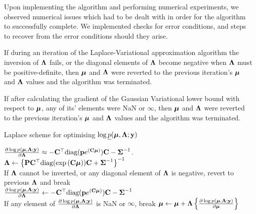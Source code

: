 	Upon implementing the algorithm and performing numerical experiments, we observed numerical issues which had to be dealt with in 
	order for the algorithm to successfully complete.
	We implemented checks for error conditions, and steps to recover from the error conditions should
	they arise.

	If during an iteration of the Laplace-Variational approximation algorithm the inversion  of ${\boldsymbol \Lambda}$
	fails, or the diagonal elements of ${\boldsymbol \Lambda}$ become negative when ${\boldsymbol \Lambda}$ must be positive-definite,
	then ${\boldsymbol \mu}$ and ${\boldsymbol \Lambda}$ were reverted to the previous iteration's ${\boldsymbol \mu}$ and ${\boldsymbol \Lambda}$ values and
	the algorithm was terminated.

	If after calculating the gradient of the Gaussian Variational lower bound with respect to ${\boldsymbol \mu}$, any of
	its' elements were NaN or $\infty$, then ${\boldsymbol \mu}$ and ${\boldsymbol \Lambda}$ were reverted to the previous iteration's
	${\boldsymbol \mu}$ and ${\boldsymbol \Lambda}$ values and the algorithm was terminated.
			
	\begin{algorithm}
		\caption{Laplace scheme for optimising $\log \underline{p}({\boldsymbol \mu}, {\boldsymbol \Lambda}; {\bf y})$}
		\label{alg:laplace_alg}
		\begin{algorithmic}
			\REQUIRE $\frac{\partial \log p({\boldsymbol \mu}, {\boldsymbol \Lambda}; {\bf y})}{\partial {\boldsymbol\Lambda}} \approx - {\bf C}^\top \text{diag}({\bf p} e^{({\bf C} {\boldsymbol \mu})}) {\bf C} - {\boldsymbol \Sigma}^{-1}$.
			\STATE ${\boldsymbol \Lambda} \leftarrow \left \{{\bf P} {\bf C}^\top \text{diag}(\exp{({\bf C}{\boldsymbol\mu})}) {\bf C} + {\boldsymbol \Sigma}^{-1} \right \}^{-1}$ \\ [1ex] 
			If ${\boldsymbol \Lambda}$ cannot be inverted, or any diagonal element of ${\boldsymbol \Lambda}$ is negative, revert to previous
			${\boldsymbol \Lambda}$ and break \\ [1ex]
			\STATE $\frac{\partial \log p({\boldsymbol \mu}, {\boldsymbol \Lambda}; {\bf y})}{\partial {\boldsymbol\Lambda}}
			\leftarrow - {\bf C}^\top \text{diag}({\bf p} e^{({\bf C} {\boldsymbol \mu})}) {\bf C} - {\boldsymbol \Sigma}^{-1}$ \\ [1ex]
			If any element of $\frac{\partial \log p({\boldsymbol \mu}, {\boldsymbol \Lambda}; {\bf y})}{\partial {\boldsymbol\Lambda}}$ is NaN or $\infty$,
			break
			\STATE ${\boldsymbol \mu} \leftarrow {\boldsymbol\mu} + {\boldsymbol \Lambda} \left \{ \frac{\partial \log p({\boldsymbol \mu}, {\boldsymbol \Lambda}; {\bf y})}{\partial {\boldsymbol\mu}} \right \}$ \\ [1ex]
			\ENDWHILE
		\end{algorithmic}
	\end{algorithm}
			
